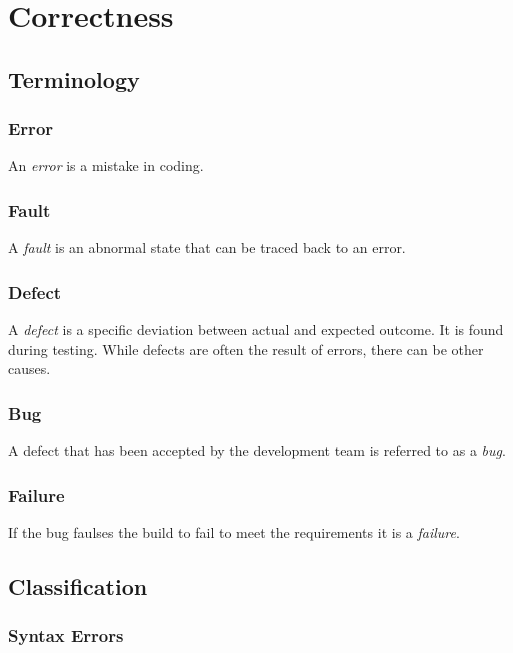 \section{Correctness}
\label{a:topic/correctness}

\subsection{Terminology}

\subsubsection{Error}

An \textsl{error} is a mistake in coding.

\subsubsection{Fault}

A \textsl{fault} is an abnormal state that can be traced back to an error.

\subsubsection{Defect}

A \textsl{defect} is a specific deviation between actual and expected outcome. It is found during testing. While defects are often the result of errors, there can be other causes.

\subsubsection{Bug}

A defect that has been accepted by the development team is referred to as a \textsl{bug}.

\subsubsection{Failure}

If the bug faulses the build to fail to meet the requirements it is a \textsl{failure}.

\subsection{Classification}

\subsubsection{Syntax Errors}

